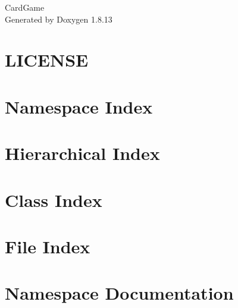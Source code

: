 \documentclass[twoside]{book}
\newcommand{\+}{\discretionary{\mbox{\scriptsize$\hookleftarrow$}}{}{}}
\newcommand{\clearemptydoublepage}{%
  \newpage{\pagestyle{empty}\cleardoublepage}%
}
\begin{document}
\hypersetup{pageanchor=false,
             bookmarksnumbered=true,
             pdfencoding=unicode
            }
\begin{titlepage}
\vspace*{7cm}
\begin{center}%
{\Large Card\+Game }\\
\vspace*{1cm}
{\large Generated by Doxygen 1.8.13}\\
\end{center}
\end{titlepage}
\clearemptydoublepage
{}
\tableofcontents
\clearemptydoublepage
{}
\hypersetup{pageanchor=true}

\chapter{L\+I\+C\+E\+N\+SE}
\label{md_packages__newtonsoft_8_json_810_80_83__l_i_c_e_n_s_e}

\chapter{Namespace Index}

\chapter{Hierarchical Index}

\chapter{Class Index}

\chapter{File Index}

\chapter{Namespace Documentation}





\end{document}
